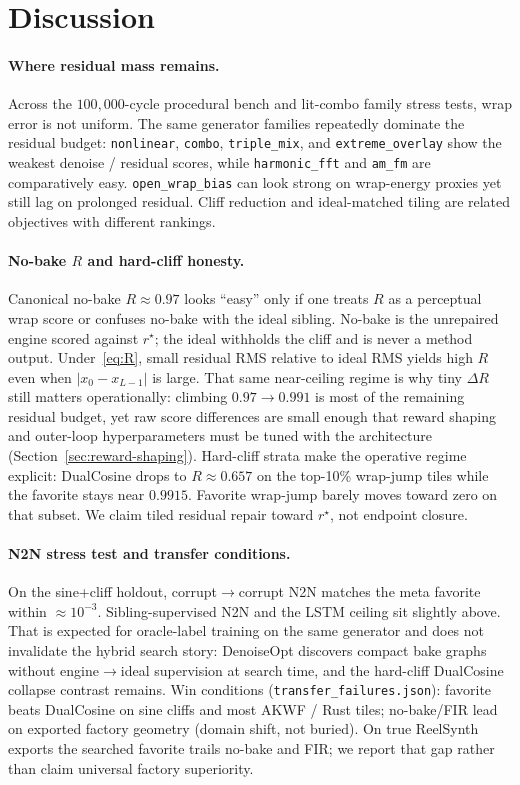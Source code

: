 \section{Discussion}
\label{sec:discussion}

\paragraph{Where residual mass remains.}
Across the $100{,}000$-cycle procedural bench and lit-combo family stress tests, wrap error is not uniform.
The same generator families repeatedly dominate the residual budget: \texttt{nonlinear}, \texttt{combo}, \texttt{triple\_mix}, and \texttt{extreme\_overlay} show the weakest denoise / residual scores, while \texttt{harmonic\_fft} and \texttt{am\_fm} are comparatively easy.
\texttt{open\_wrap\_bias} can look strong on wrap-energy proxies yet still lag on prolonged residual. Cliff reduction and ideal-matched tiling are related objectives with different rankings.

\paragraph{No-bake $R$ and hard-cliff honesty.}
Canonical no-bake $R\approx 0.97$ looks ``easy'' only if one treats $R$ as a perceptual wrap score or confuses no-bake with the ideal sibling.
No-bake is the unrepaired engine scored against $r^{\star}$; the ideal withholds the cliff and is never a method output.
Under~\eqref{eq:R}, small residual RMS relative to ideal RMS yields high $R$ even when $|x_0-x_{L-1}|$ is large.
That same near-ceiling regime is why tiny $\Delta R$ still matters operationally: climbing $0.97\to 0.991$ is most of the remaining residual budget, yet raw score differences are small enough that reward shaping and outer-loop hyperparameters must be tuned with the architecture (Section~\ref{sec:reward-shaping}).
Hard-cliff strata make the operative regime explicit: DualCosine drops to $R\approx 0.657$ on the top-10\% wrap-jump tiles while the favorite stays near $0.9915$.
Favorite wrap-jump barely moves toward zero on that subset.
We claim tiled residual repair toward $r^{\star}$, not endpoint closure.

\paragraph{N2N stress test and transfer conditions.}
On the sine{+}cliff holdout, corrupt$\to$corrupt N2N matches the meta favorite within $\approx 10^{-3}$.
Sibling-supervised N2N and the LSTM ceiling sit slightly above.
That is expected for oracle-label training on the same generator and does not invalidate the hybrid search story:
DenoiseOpt discovers compact bake graphs without engine$\to$ideal supervision at search time, and the hard-cliff DualCosine collapse contrast remains.
Win conditions (\texttt{transfer\_failures.json}): favorite beats DualCosine on sine cliffs and most AKWF / Rust tiles; no-bake/FIR lead on exported factory geometry (domain shift, not buried).
On true ReelSynth exports the searched favorite trails no-bake and FIR; we report that gap rather than claim universal factory superiority.

